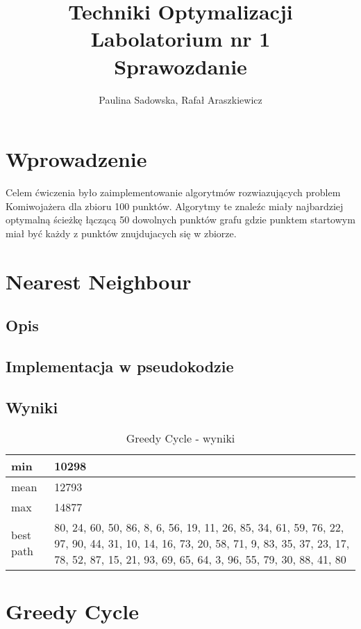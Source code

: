 \documentclass[a4paper 10pt]{article}
\title{\textbf{Techniki Optymalizacji} \\
Labolatorium nr 1 \\
Sprawozdanie}
\author{Paulina Sadowska, Rafał Araszkiewicz}
\begin{document}
\maketitle

\section{Wprowadzenie}
Celem ćwiczenia było zaimplementowanie algorytmów rozwiazujących problem Komiwojażera dla zbioru 100 punktów. Algorytmy te znaleźc miały najbardziej optymalną ścieżkę łączącą 50 dowolnych punktów grafu gdzie punktem startowym miał być każdy z punktów znujdujacych się w zbiorze.
\section{Nearest Neighbour}
\subsection{Opis}
\subsection{Implementacja w pseudokodzie}
\subsection{Wyniki}
\begin{table}[H]
\center
\caption{Greedy Cycle - wyniki}
\label{Greedy Cycle - wyniki}
\begin{tabular}{|p{1cm}|p{14cm}|}
\hline
min       & 10298 \\ \hline
mean      & 12793                                                                                                                                                                                                 \\ \hline
max       & 14877 \\ \hline
best path & 80, 24, 60, 50, 86, 8, 6, 56, 19, 11, 26, 85, 34, 61, 59, 76, 22, 97, 90, 44, 31, 10, 14, 16, 73, 20, 58, 71, 9, 83, 35, 37, 23, 17, 78, 52, 87, 15, 21, 93, 69, 65, 64, 3, 96, 55, 79, 30, 88, 41, 80 \\ \hline
\end{tabular}
\end{table}

\section{Greedy Cycle}
\label{Greedy}
\end{document}
